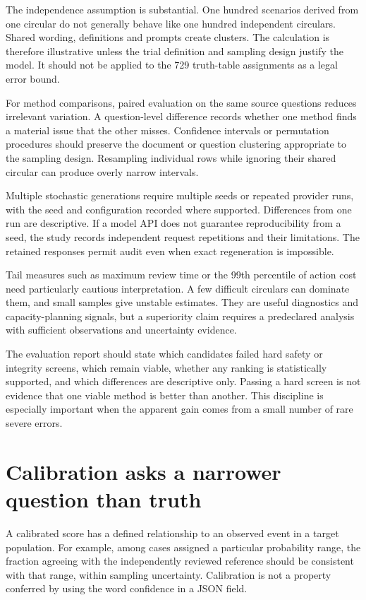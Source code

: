 The independence assumption is substantial. One hundred scenarios derived from
one circular do not generally behave like one hundred independent circulars.
Shared wording, definitions and prompts create clusters. The calculation is
therefore illustrative unless the trial definition and sampling design justify
the model. It should not be applied to the 729 truth-table assignments as a legal
error bound.

For method comparisons, paired evaluation on the same source questions reduces
irrelevant variation. A question-level difference records whether one method
finds a material issue that the other misses. Confidence intervals or permutation
procedures should preserve the document or question clustering appropriate to the
sampling design. Resampling individual rows while ignoring their shared circular
can produce overly narrow intervals.

Multiple stochastic generations require multiple seeds or repeated provider runs,
with the seed and configuration recorded where supported. Differences from one
run are descriptive. If a model API does not guarantee reproducibility from a
seed, the study records independent request repetitions and their limitations.
The retained responses permit audit even when exact regeneration is impossible.

Tail measures such as maximum review time or the 99th percentile of action cost
need particularly cautious interpretation. A few difficult circulars can dominate
them, and small samples give unstable estimates. They are useful diagnostics and
capacity-planning signals, but a superiority claim requires a predeclared analysis
with sufficient observations and uncertainty evidence.

The evaluation report should state which candidates failed hard safety or
integrity screens, which remain viable, whether any ranking is statistically
supported, and which differences are descriptive only. Passing a hard screen is
not evidence that one viable method is better than another. This discipline is
especially important when the apparent gain comes from a small number of rare
severe errors.

\section{Calibration asks a narrower question than truth}
\label{merge:M09:08}


A calibrated score has a defined relationship to an observed event in a target
population. For example, among cases assigned a particular probability range,
the fraction agreeing with the independently reviewed reference should be
consistent with that range, within sampling uncertainty. Calibration is not a
property conferred by using the word confidence in a JSON field.

